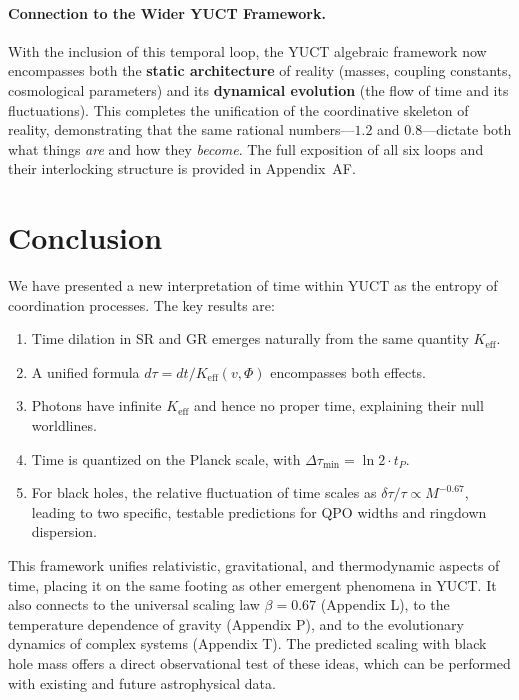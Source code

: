 \documentclass[12pt,a4paper]{article}
\newcommand{\Keff}{K_{\mathrm{eff}}}
\begin{document}
	\paragraph{Connection to the Wider YUCT Framework.}
	With the inclusion of this temporal loop, the YUCT algebraic framework now encompasses both the \textbf{static architecture} of reality (masses, coupling constants, cosmological parameters) and its \textbf{dynamical evolution} (the flow of time and its fluctuations). This completes the unification of the coordinative skeleton of reality, demonstrating that the same rational numbers—\(1.2\) and \(0.8\)—dictate both what things \emph{are} and how they \emph{become}. The full exposition of all six loops and their interlocking structure is provided in Appendix~AF.
	
	\section{Conclusion}
	
	We have presented a new interpretation of time within YUCT as the entropy of coordination processes. The key results are:
	\begin{enumerate}
		\item Time dilation in SR and GR emerges naturally from the same quantity \(\Keff\).
		\item A unified formula \(d\tau = dt/\Keff(v,\Phi)\) encompasses both effects.
		\item Photons have infinite \(\Keff\) and hence no proper time, explaining their null worldlines.
		\item Time is quantized on the Planck scale, with \(\Delta \tau_{\min} = \ln 2 \cdot t_P\).
		\item For black holes, the relative fluctuation of time scales as \(\delta\tau/\tau \propto M^{-0.67}\), leading to two specific, testable predictions for QPO widths and ringdown dispersion.
	\end{enumerate}
	
	This framework unifies relativistic, gravitational, and thermodynamic aspects of time, placing it on the same footing as other emergent phenomena in YUCT. It also connects to the universal scaling law \(\beta = 0.67\) (Appendix L), to the temperature dependence of gravity (Appendix P), and to the evolutionary dynamics of complex systems (Appendix T). The predicted scaling with black hole mass offers a direct observational test of these ideas, which can be performed with existing and future astrophysical data.
	
\end{document}
